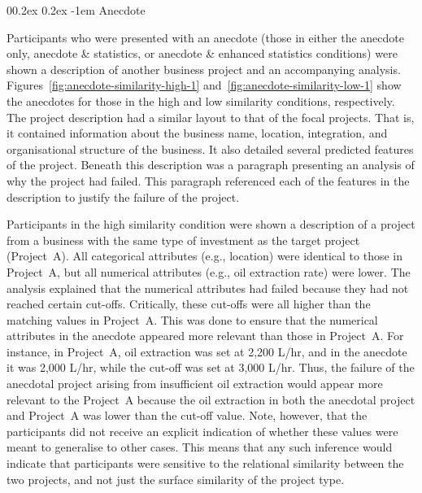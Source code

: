 \documentclass[
  man, donotrepeattitle,floatsintext]{apa7}
\makeatletter
\let\oldparagraph\paragraph
\renewcommand{\paragraph}[1]{\oldparagraph{#1}\mbox{}}
\renewcommand{\paragraph}{\@startsection{paragraph}{4}{\parindent}%
  {0\baselineskip \@plus 0.2ex \@minus 0.2ex}%
  {-1em}%
  {\normalfont\normalsize\bfseries\itshape\typesectitle}}
\theoremstyle{definition}
\theoremstyle{definition}
\theoremstyle{definition}
\theoremstyle{definition}
\theoremstyle{remark}
\makeatother
\begin{document}
\hypertarget{anecdote}{%
\paragraph{Anecdote}\label{anecdote}}

Participants who were presented with an anecdote (those in either the anecdote
only, anecdote \& statistics, or anecdote \& enhanced statistics conditions) were
shown a description of another business project and an accompanying analysis.
Figures~\ref{fig:anecdote-similarity-high-1}
and~\ref{fig:anecdote-similarity-low-1} show the anecdotes
for those in the high and low similarity conditions, respectively. The project
description had a similar layout to that of the focal projects. That is, it
contained information about the business name, location, integration, and
organisational structure of the business. It also detailed several predicted
features of the project. Beneath this description was a paragraph presenting an
analysis of why the project had failed. This paragraph referenced each of the
features in the description to justify the failure of the project.

Participants in the high similarity condition were shown a description of a
project from a business with the same type of investment as the target project
(Project~A). All categorical attributes (e.g., location) were identical to those
in Project~A, but all numerical attributes (e.g., oil extraction rate) were
lower. The analysis explained that the numerical attributes had failed because
they had not reached certain cut-offs. Critically, these cut-offs were all
higher than the matching values in Project~A. This was done to ensure that the
numerical attributes in the anecdote appeared more relevant than those in
Project~A. For instance, in Project~A, oil extraction was set at 2,200 L/hr, and
in the anecdote it was 2,000 L/hr, while the cut-off was set at 3,000 L/hr.
Thus, the failure of the anecdotal project arising from insufficient oil
extraction would appear more relevant to the Project~A because the oil
extraction in both the anecdotal project and Project~A was lower than the
cut-off value. Note, however, that the participants did not receive an explicit
indication of whether these values were meant to generalise to other cases. This
means that any such inference would indicate that participants were sensitive to
the relational similarity between the two projects, and not just the surface
similarity of the project type.
\end{document}
